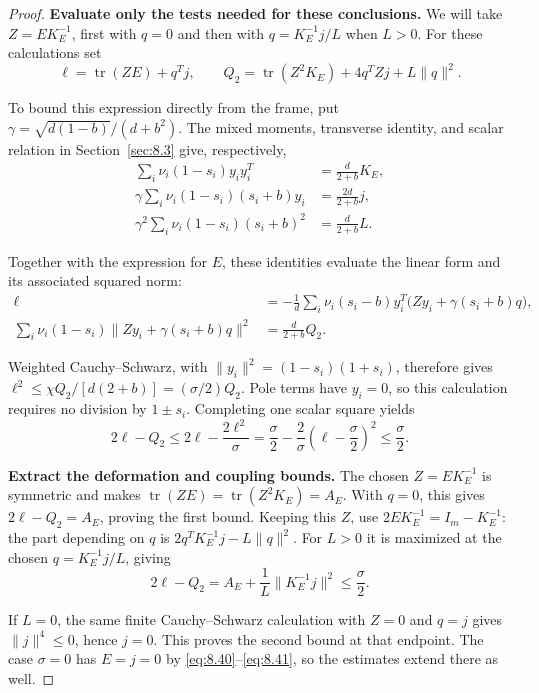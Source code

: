 \begin{proof}
\textbf{Evaluate only the tests needed for these conclusions.} We will take $Z=EK_E^{-1}$, first with $q=0$ and then with
$q=K_E^{-1}j/L$ when $L>0$. For these calculations set
\begin{equation}\label{eq:8.50}
\ell=\operatorname{tr}(ZE)+q^Tj,\qquad
Q_2=\operatorname{tr}(Z^2K_E)+4q^TZj+L\|q\|^2.
\end{equation}

To bound this expression directly from the frame, put
$\gamma=\sqrt{d(1-b)}/(d+b^2)$. The mixed moments, transverse identity,
and scalar relation in Section~\ref{sec:8.3} give, respectively,
\begin{equation}\label{eq:8.51}
\begin{aligned}
\sum_i\nu_i(1-s_i)y_iy_i^T&=\frac d{2+b}K_E,\\
\gamma\sum_i\nu_i(1-s_i)(s_i+b)y_i&=\frac{2d}{2+b}j,\\
\gamma^2\sum_i\nu_i(1-s_i)(s_i+b)^2&=\frac d{2+b}L.
\end{aligned}
\end{equation}

Together with the expression for $E$, these identities evaluate the linear
form and its associated squared norm:
\begin{equation}\label{eq:8.52}
\begin{aligned}
\ell&=-\frac1d\sum_i\nu_i(s_i-b)y_i^T
\bigl(Zy_i+\gamma(s_i+b)q\bigr),\\
\sum_i\nu_i(1-s_i)\|Zy_i+\gamma(s_i+b)q\|^2
&=\frac d{2+b}Q_2.
\end{aligned}
\end{equation}

Weighted Cauchy--Schwarz, with
$\|y_i\|^2=(1-s_i)(1+s_i)$, therefore gives
$\ell^2\le\chi Q_2/[d(2+b)]=(\sigma/2)Q_2$.
Pole terms have $y_i=0$, so this calculation requires no division by
$1\pm s_i$. Completing one scalar square yields
\begin{equation}\label{eq:8.53}
2\ell-Q_2\le2\ell-\frac{2\ell^2}{\sigma}
=\frac\sigma2-\frac2\sigma\left(\ell-\frac\sigma2\right)^2
\le\frac\sigma2.
\end{equation}

\textbf{Extract the deformation and coupling bounds.}
The chosen $Z=EK_E^{-1}$ is symmetric and makes
$\operatorname{tr}(ZE)=\operatorname{tr}(Z^2K_E)=A_E$.
With $q=0$, this gives $2\ell-Q_2=A_E$, proving the first bound.
Keeping this $Z$, use $2EK_E^{-1}=I_m-K_E^{-1}$: the part depending on $q$
is $2q^TK_E^{-1}j-L\|q\|^2$. For $L>0$ it is maximized at the chosen
$q=K_E^{-1}j/L$, giving
\begin{equation}\label{eq:8.54}
2\ell-Q_2=A_E+\frac1L\|K_E^{-1}j\|^2\le\frac\sigma2.
\end{equation}

If $L=0$, the same finite Cauchy--Schwarz calculation with $Z=0$ and $q=j$
gives $\|j\|^4\le0$, hence $j=0$. This proves the second bound at that endpoint.
The case $\sigma=0$ has $E=j=0$ by \eqref{eq:8.40}--\eqref{eq:8.41}, so the estimates extend
there as well. 
\end{proof}

